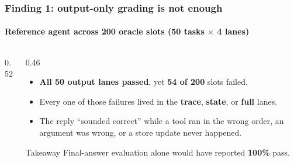 \documentclass[
	aspectratio=169, %
	t,               %
	onlytextwidth,
	10pt,
]{beamer}
\begin{document}
\begin{frame}
	\frametitle{Finding 1: output-only grading is not enough}
	\framesubtitle{Reference agent across 200 oracle slots (50 tasks $\times$ 4 lanes)}
	\begin{columns}[T]
		\begin{column}{0.52\linewidth}
			\centering
			\vspace{0.4em}
		\end{column}
		\begin{column}{0.46\linewidth}
			\begin{itemize}
				\setlength\itemsep{0.6em}
				\item \textbf{All 50 output lanes passed}, yet \textbf{54 of 200} slots failed.
				\item Every one of those failures lived in the \textbf{trace}, \textbf{state}, or \textbf{full} lanes.
				\item The reply ``sounded correct'' while a tool ran in the wrong order, an argument
				was wrong, or a store update never happened.
			\end{itemize}
			\vspace{0.3em}
			\begin{block}{\small Takeaway}
				\small Final-answer evaluation alone would have reported \textbf{100\%} pass.
			\end{block}
		\end{column}
	\end{columns}
\end{frame}
\end{document}
